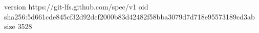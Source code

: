 version https://git-lfs.github.com/spec/v1
oid sha256:5d661cde845cf32d92dcf2000b83d42482f58bba3079d7d718e95573189cd3ab
size 3528
